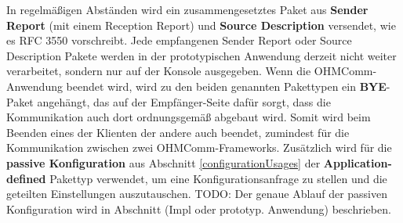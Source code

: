 In regelmäßigen Abständen wird ein zusammengesetztes Paket aus \textbf{Sender Report} (mit einem Reception Report) und \textbf{Source Description} versendet, wie es RFC 3550 vorschreibt. Jede empfangenen Sender Report oder Source Description Pakete werden in der prototypischen Anwendung derzeit nicht weiter verarbeitet, sondern nur auf der Konsole ausgegeben. Wenn die OHMComm-Anwendung beendet wird, wird zu den beiden genannten Pakettypen ein \textbf{BYE}-Paket angehängt, das auf der Empfänger-Seite dafür sorgt, dass die Kommunikation auch dort ordnungsgemäß abgebaut wird. Somit wird beim Beenden eines der Klienten der andere auch beendet, zumindest für die Kommunikation zwischen zwei OHMComm-Frameworks. Zusätzlich wird für die \textbf{passive Konfiguration} aus Abschnitt \ref{configurationUsages} der \textbf{Application-defined} Pakettyp verwendet, um eine Konfigurationsanfrage zu stellen und die geteilten Einstellungen auszutauschen. TODO: Der genaue Ablauf der passiven Konfiguration wird in Abschnitt (Impl oder prototyp. Anwendung) beschrieben.

